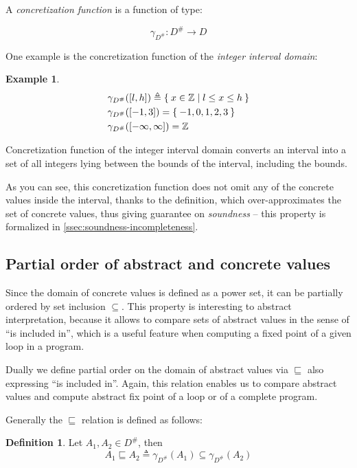 \documentclass[12pt,oneside]{fithesis2}
\theoremstyle{definition}
\newtheorem{exmp}{Example}[section]
\newtheorem{definition}{Definition}
\begin{document}
A \textit{concretization function} is a function of type:

\[
\gamma_{D^\#}\colon D^\# \to D
\]

One example is the concretization function of the \textit{integer interval domain}:

\begin{exmp}
  \begin{align*}
    &\gamma_{D^\#}([l,h]) \triangleq \Set{x \in \mathbb Z | l \le x \le h}\\
    &\gamma_{D^\#}([-1,3]) = \Set{-1, 0, 1, 2, 3}\\
    &\gamma_{D^\#}([-\infty, \infty]) = \mathbb Z
  \end{align*}
\end{exmp}

Concretization function of the integer interval domain converts an interval into a set of all integers lying between the bounds of the interval, including the bounds.

As you can see, this concretization function does not omit any of the concrete values inside the interval, thanks to the definition, which over-approximates the set of concrete values, thus giving guarantee on \textit{soundness} -- this property is formalized in \ref{ssec:soundness-incompleteness}.

\subsection{Partial order of abstract and concrete values}

Since the domain of concrete values is defined as a power set, it can be partially ordered by set inclusion $\subseteq$. This property is interesting to abstract interpretation, because it allows to compare sets of abstract values in the sense of ``is included in'', which is a useful feature when computing a fixed point of a given loop in a program.

Dually we define partial order on the domain of abstract values via $\sqsubseteq$ also expressing ``is included in''. Again, this relation enables us to compare abstract values and compute abstract fix point of a loop or of a complete program.

Generally the $\sqsubseteq$ relation is defined as follows:

\begin{definition}
  Let $A_1, A_2 \in D^\#$, then
  \[
    A_1 \sqsubseteq A_2 \triangleq \gamma_{D^\#}(A_1) \subseteq \gamma_{D^\#}(A_2)
  \]
\end{definition}
\end{document}
